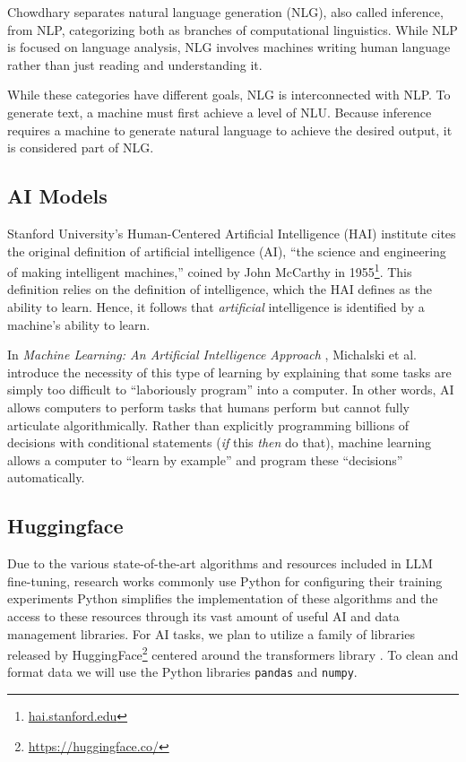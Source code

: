 Chowdhary separates natural language generation (NLG), also called inference, from NLP, categorizing both as branches of computational linguistics. While NLP is focused on language analysis, NLG involves machines writing human language rather than just reading and understanding it.

While these categories have different goals, NLG is interconnected with NLP. To generate text, a machine must first achieve a level of NLU. Because inference requires a machine to generate natural language to achieve the desired output, it is considered part of NLG.

\subsection{AI Models}
Stanford University's Human-Centered Artificial Intelligence (HAI) institute cites the original definition of artificial intelligence (AI), ``the science and engineering of making intelligent machines,'' coined by John McCarthy in 1955\footnote{\href{https://hai.stanford.edu/sites/default/files/2020-09/AI-Definitions-HAI.pdf}{hai.stanford.edu}}. This definition relies on the definition of intelligence, which the HAI defines as the ability to learn. Hence, it follows that \textit{artificial} intelligence is identified by a machine's ability to learn.

In \textit{Machine Learning: An Artificial Intelligence Approach} \cite{michalski2014}, Michalski et al. introduce the necessity of this type of learning by explaining that some tasks are simply too difficult to ``laboriously program'' into a computer. In other words, AI allows computers to perform tasks that humans perform but cannot fully articulate algorithmically. Rather than explicitly programming billions of decisions with conditional statements (\textit{if} this \textit{then} do that), machine learning allows a computer to ``learn by example'' and program these ``decisions'' automatically.

\subsection{Huggingface}
Due to the various state-of-the-art algorithms and resources included in LLM fine-tuning, research works commonly use Python for configuring their training experiments Python simplifies the implementation of these algorithms and the access to these resources through its vast amount of useful AI and data management libraries. For AI tasks, we plan to utilize a family of libraries released by HuggingFace\footnote{\url{https://huggingface.co/}} centered around the transformers library \cite{wolf2020}. To clean and format data we will use the Python libraries \lstinline{pandas} and \lstinline{numpy}.

